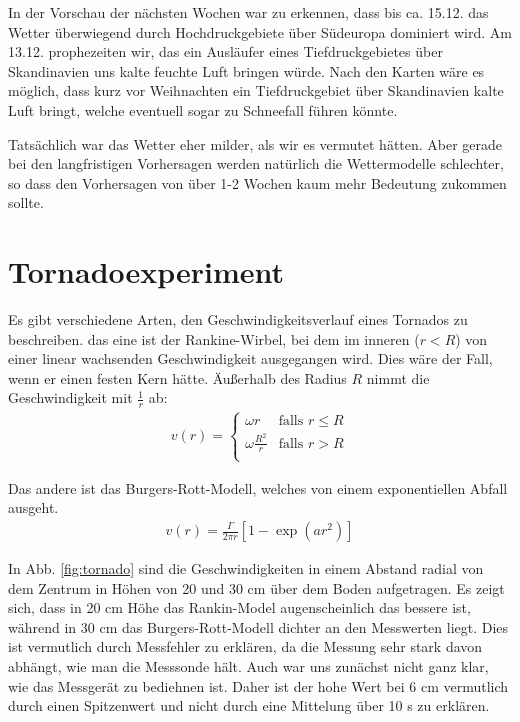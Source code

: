 \documentclass[12pt,a4paper,titlepage,headinclude,bibtotoc]{scrartcl}
\begin{document}
In der Vorschau der nächsten Wochen war zu erkennen, dass bis ca. 15.12. das Wetter überwiegend durch Hochdruckgebiete über Südeuropa dominiert wird.
Am 13.12. prophezeiten wir, das ein Ausläufer eines Tiefdruckgebietes über Skandinavien uns kalte feuchte Luft bringen würde.
Nach den Karten wäre es möglich, dass kurz vor Weihnachten ein Tiefdruckgebiet über Skandinavien kalte Luft bringt, welche eventuell sogar zu Schneefall führen könnte.

Tatsächlich war das Wetter eher milder, als wir es vermutet hätten.
Aber gerade bei den langfristigen Vorhersagen werden natürlich die Wettermodelle schlechter, so dass den Vorhersagen von über 1-2 Wochen kaum mehr Bedeutung zukommen sollte.






\section{Tornadoexperiment}
Es gibt verschiedene Arten, den Geschwindigkeitsverlauf eines Tornados zu beschreiben.
das eine ist der Rankine-Wirbel, bei dem im inneren ($r<R$) von einer linear wachsenden Geschwindigkeit ausgegangen wird.
Dies wäre der Fall, wenn er einen festen Kern hätte.
Äußerhalb des Radius $R$ nimmt die Geschwindigkeit mit $\frac{1}{r}$ ab:
\begin{align}
	v(r) = 
	\begin{cases}
		\omega r & \text{falls } r \leq R\\
		\omega \frac{R^2}{r} & \text{falls } r > R\\
	\end{cases}
\end{align}


Das andere ist das Burgers-Rott-Modell, welches von einem exponentiellen Abfall ausgeht.
\begin{align}
	v(r) = \frac{\Gamma}{2\pi r}\left[1-\exp\left(a r^2\right)\right]
\end{align}

In Abb. \ref{fig:tornado} sind die Geschwindigkeiten in einem Abstand radial von dem Zentrum in Höhen von 20 und 30 cm über dem Boden aufgetragen.
Es zeigt sich, dass in 20 cm Höhe das Rankin-Model augenscheinlich das bessere ist, während in 30 cm das Burgers-Rott-Modell dichter an den Messwerten liegt.
Dies ist vermutlich durch Messfehler zu erklären, da die Messung sehr stark davon abhängt, wie man die Messsonde hält.
Auch war uns zunächst nicht ganz klar, wie das Messgerät zu bediehnen ist.
Daher ist der hohe Wert bei 6 cm vermutlich durch einen Spitzenwert und nicht durch eine Mittelung über 10 s zu erklären.
\end{document}
